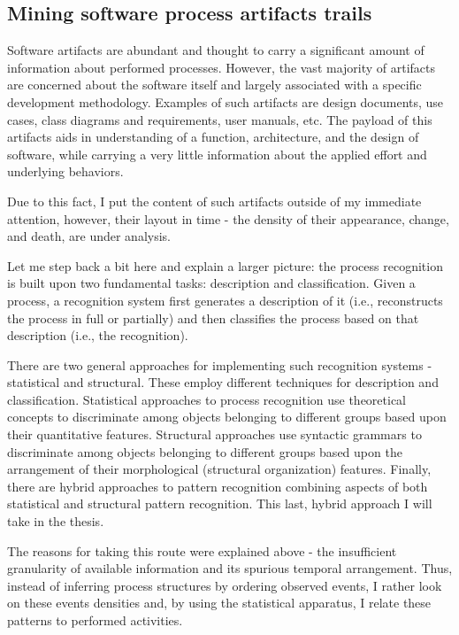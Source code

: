 \documentclass[11pt,oneside]{article}
\numberwithin{equation}{subsection}
\begin{document}
\subsection{Mining software process artifacts trails}
Software artifacts are abundant and thought to carry a significant amount of information about
performed processes. However, the vast majority of artifacts are concerned about the software itself
and largely associated  with a specific development methodology. Examples of such artifacts are
design documents, use cases, class diagrams and requirements, user manuals, etc. The payload of this
artifacts aids in understanding of a function, architecture, and the design of software, while
carrying a very little information about the applied effort and underlying behaviors. 

Due to this fact, I put the content of such artifacts outside of my immediate attention,
however, their layout in time - the density of their appearance, change, and death, are under
analysis.

Let me step back a bit here and explain a larger picture: the process recognition is built upon two
fundamental tasks: description and classification. Given a process, a recognition system first
generates a description of it (i.e., reconstructs the process in full or partially) and then
classifies the process based on that description (i.e., the recognition).

There are two general approaches for implementing such recognition systems - statistical and
structural. These employ different techniques for description and classification. Statistical
approaches to process recognition use theoretical concepts to discriminate among objects belonging
to different groups based upon their quantitative features. Structural approaches use syntactic
grammars to discriminate among objects belonging to different groups based upon the arrangement of
their morphological (structural organization) features. Finally, there are hybrid approaches to
pattern recognition combining aspects of both statistical and structural pattern recognition. This
last, hybrid approach I will take in the thesis.

The reasons for taking this route were explained above - the insufficient granularity of
available information and its spurious temporal arrangement. Thus, instead of inferring
process structures by ordering observed events, I rather look on these events densities and, by
using the statistical apparatus, I relate these patterns to performed activities. 
\end{document}
